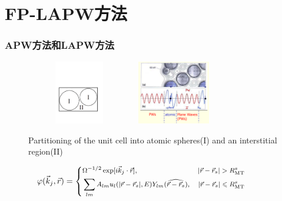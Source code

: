 \section{FP-LAPW方法}
\frame
{
\frametitle{\textrm{APW}方法和\textrm{LAPW}方法}
\begin{figure}[h!]
\centering
\includegraphics[height=1.10in,width=1.80in,viewport=40 150 545 465,clip]{Figures/Muffin_tin.pdf}
\includegraphics[height=1.10in,width=1.45in,viewport=1 20 485 435,clip]{Figures/APW.png}
\caption{\small \textrm{Partitioning of the unit cell into atomic spheres(I) and an interstitial region(II)}}%
\label{Muffin_tin}
\end{figure}
\begin{displaymath}
\hskip -28pt\footnotesize \varphi(\vec k_j,\vec r)=\left\{
  \begin{aligned}
    &\Omega^{-1/2}\exp[i\vec k_j\cdot\vec r],&|\vec r-\vec r_s|>R_{\mathrm{MT}}^s\\
    &\sum_{lm}A_{lm}u_l(|\vec r-\vec r_s|,E)Y_{lm}(\widehat{\vec r-\vec r_s}),&|\vec r-\vec r_s|\leqslant R_{\mathrm{MT}}^s
  \end{aligned}
\right.
\end{displaymath}
}

